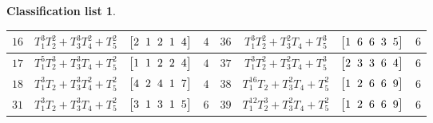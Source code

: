 \documentclass[10pt,a4paper]{amsart}
\theoremstyle{definition}
\newtheorem{class-list}[thm]{Classification list}
\numberwithin{equation}{section}
\begin{document}
\begin{class-list}
\begin{table}[h!]
\begin{tabu}{c|c|c|c||c|c|c|c}
${16}$&${T_{1}^{3}T_{2}^{2}+T_{3}^{3}T_{4}^{2}+T_{5}^{2}}$
&$\arraycolsep=1mm\begin{bmatrix}{2} & {1} & {2} & {1} & {4}\end{bmatrix}$&${4}$
&${36}$&${T_{1}^{3}T_{2}^{2}+T_{3}^{2}T_{4}+T_{5}^{3}}$
&$\arraycolsep=1mm\begin{bmatrix}{1} & {6} & {6} & {3} & {5}\end{bmatrix}$&${6}$
\\
\hline
${17}$&${T_{1}^{5}T_{2}^{3}+T_{3}^{3}T_{4}+T_{5}^{2}}$
&$\arraycolsep=1mm\begin{bmatrix}{1} & {1} & {2} & {2} & {4}\end{bmatrix}$&${4}$
&${37}$&${T_{1}^{3}T_{2}^{2}+T_{3}^{2}T_{4}+T_{5}^{3}}$
&$\arraycolsep=1mm\begin{bmatrix}{2} & {3} & {3} & {6} & {4}\end{bmatrix}$&${6}$
\\
\hline
${18}$&${T_{1}^{3}T_{2}+T_{3}^{3}T_{4}^{2}+T_{5}^{2}}$
&$\arraycolsep=1mm\begin{bmatrix}{4} & {2} & {4} & {1} & {7}\end{bmatrix}$&${4}$
&${38}$&${T_{1}^{16}T_{2}+T_{3}^{2}T_{4}+T_{5}^{2}}$
&$\arraycolsep=1mm\begin{bmatrix}{1} & {2} & {6} & {6} & {9}\end{bmatrix}$&${6}$
\\
\hline
${31}$&${T_{1}^{3}T_{2}+T_{3}^{3}T_{4}+T_{5}^{2}}$
&$\arraycolsep=1mm\begin{bmatrix}{3} & {1} & {3} & {1} & {5}\end{bmatrix}$&${6}$
&${39}$&${T_{1}^{12}T_{2}^{3}+T_{3}^{2}T_{4}+T_{5}^{2}}$
&$\arraycolsep=1mm\begin{bmatrix}{1} & {2} & {6} & {6} & {9}\end{bmatrix}$&${6}$
\\
\hline
\end{tabu}
\end{table}


\end{class-list}
\end{document}
